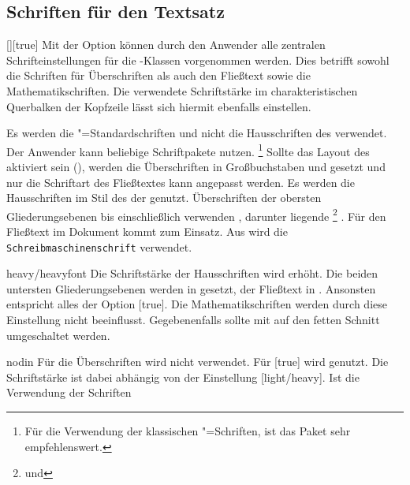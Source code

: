 \subsection{Schriften für den Textsatz}
\begin{Declaration}{[\PSet]}[true]%
\printdeclarationlist%
\label{sec:text}%
%
%
Mit der Option  können durch den Anwender alle zentralen 
Schrifteinstellungen für die \TUDScript-Klassen vorgenommen werden. Dies 
betrifft sowohl die Schriften für Überschriften als auch den Fließtext sowie 
die Mathematikschriften. Die verwendete Schriftstärke im charakteristischen 
Querbalken der Kopfzeile lässt sich hiermit ebenfalls einstellen.
%
\begin{values}
\itemfalse
  Es werden die "=Standardschriften und nicht die Hausschriften 
  des \CDs verwendet. Der Anwender kann beliebige Schriftpakete nutzen.%
  \footnote{%
    Für die Verwendung der klassischen "=Schriften, ist das Paket 
     sehr empfehlenswert.%
  }
  Sollte das Layout des \CDs aktiviert sein (), werden die 
  Überschriften in Großbuchstaben und \DIN gesetzt und nur die Schriftart des 
  Fließtextes kann angepasst werden.
  Es werden die Hausschriften im Stil des \CDs der \TnUD genutzt. Überschriften 
  der obersten Gliederungsebenen bis einschließlich  
  verwenden \DIN, darunter liegende%
  \footnote{ und } 
  . Für den Fließtext im Dokument kommt 
   zum Einsatz. Aus  wird die
  \texttt{Schreibmaschinenschrift} verwendet.
\item[heavy/heavyfont]
  Die Schriftstärke der Hausschriften wird erhöht. Die beiden untersten 
  Gliederungsebenen werden in  gesetzt, der Fließtext 
  in . Ansonsten entspricht alles der Option 
  [true]. Die Mathematikschriften werden durch diese 
  Einstellung nicht beeinflusst. Gegebenenfalls sollte mit  auf 
  den fetten Schnitt umgeschaltet werden.
\item[nodin]
  Für die Überschriften wird \DIN nicht verwendet. Für [true] 
  wird \Univers genutzt. Die Schriftstärke ist dabei abhängig von der   
  Einstellung [light/heavy]. Ist die Verwendung der Schriften 

\end{values}
\end{Declaration}
